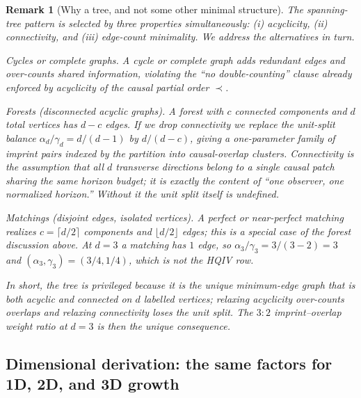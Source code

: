 \documentclass[11pt]{amsart}
\newtheorem{remark}[theorem]{Remark}
\begin{document}
\begin{remark}[Why a tree, and not some other minimal structure]
\label{rem:tree-not-complete}
The spanning-tree pattern is selected by three properties simultaneously: \emph{(i) acyclicity}, \emph{(ii) connectivity}, and \emph{(iii) edge-count minimality}. We address the alternatives in turn.

\emph{Cycles or complete graphs.} A cycle or complete graph adds redundant edges and over-counts shared information, violating the ``no double-counting'' clause already enforced by acyclicity of the causal partial order \(\prec\).

\emph{Forests (disconnected acyclic graphs).} A forest with \(c\) connected components and \(d\) total vertices has \(d-c\) edges. If we drop connectivity we replace the unit-split balance \(\alpha_d/\gamma_d=d/(d-1)\) by \(d/(d-c)\), giving a one-parameter family of imprint pairs indexed by the partition into causal-overlap clusters. Connectivity is the assumption that all \(d\) transverse directions belong to a single causal patch sharing the same horizon budget; it is exactly the content of ``one observer, one normalized horizon.'' Without it the unit split itself is undefined.

\emph{Matchings (disjoint edges, isolated vertices).} A perfect or near-perfect matching realizes \(c=\lceil d/2\rceil\) components and \(\lfloor d/2\rfloor\) edges; this is a special case of the forest discussion above. At \(d=3\) a matching has \(1\) edge, so \(\alpha_3/\gamma_3=3/(3-2)=3\) and \((\alpha_3,\gamma_3)=(3/4,1/4)\), which is \emph{not} the HQIV row.

In short, the tree is privileged because it is the unique minimum-edge graph that is both acyclic and connected on \(d\) labelled vertices; relaxing acyclicity over-counts overlaps and relaxing connectivity loses the unit split. The \(3:2\) imprint--overlap weight ratio at \(d=3\) is then the unique consequence.
\end{remark}

\subsection[Dimensional derivation]{Dimensional derivation: the same factors for 1D, 2D, and 3D growth}
\end{document}
